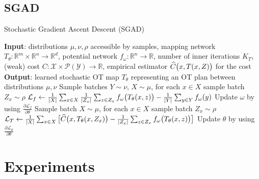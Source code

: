 \documentclass{beamer}
\begin{document}
\subsection{SGAD}
\begin{frame}{Stochastic Gradient Ascent Descent (SGAD)}
    \begin{algorithm}[H]
        \caption{\footnotesize Stochastic Gradient Ascent Descent algorithm}
        \begin{algorithmic}[1]
            \scriptsize
            \State \textbf{Input}: distributions $\mu,\nu,\rho$ accessible by samples, mapping network $T_{\theta}:\mathbb{R}^{m}\times\mathbb{R}^{n}\rightarrow\mathbb{R}^{d}$, potential network $f_{\omega}:\mathbb{R}^{n}\rightarrow\mathbb{R}$, number of inner iterations $K_{T}$, (weak) cost $C:\mathcal{X}\times\mathcal{P}(\mathcal{Y})\rightarrow\mathbb{R}$, empirical estimator $\widehat{C}\big{(}x,T(x,Z)\big{)}$ for the cost
            \State \textbf{Output}: learned stochastic OT map $T_{\theta}$ representing an OT plan between distributions $\mu,\nu$
            \Repeat
            \State Sample batches $Y\sim\nu$, $X\sim\mu$, for each $x\in X$ sample batch $Z_{x}\sim\rho$
            \State $\mathcal{L}_{f}\leftarrow\frac{1}{|X|}\sum_{x\in X}\frac{1}{|Z_{x}|}\sum_{z \in Z_{x}}f_{\omega}\big{(}T_{\theta}(x,z)\big{)}-\frac{1}{|Y|}\sum_{y\in Y}f_{ \omega}(y)$
            \State Update $\omega$ by using $\frac{\partial\mathcal{L}_{f}}{\partial\theta}$
            \State Sample batch $X\sim\mu$, for each $x\in X$ sample batch $Z_{x}\sim\rho$
            \State $\mathcal{L}_{T}\leftarrow\frac{1}{|X|}\sum_{x\in X}\big{[}\widehat{C}\big{(}x,T_{\theta}(x,Z_{x})\big{)}-\frac{1}{|Z_{x}|}\sum_{z\in Z_{x}}f_{\omega}\big{(} T_{\theta}(x,z)\big{)}\big{]}$
            \State Update $\theta$ by using $\frac{\partial\mathcal{L}_{\theta}}{\partial\theta}$
            \EndFor
        \end{algorithmic}
    \end{algorithm}
\end{frame}

\section{Experiments}
\end{document}
